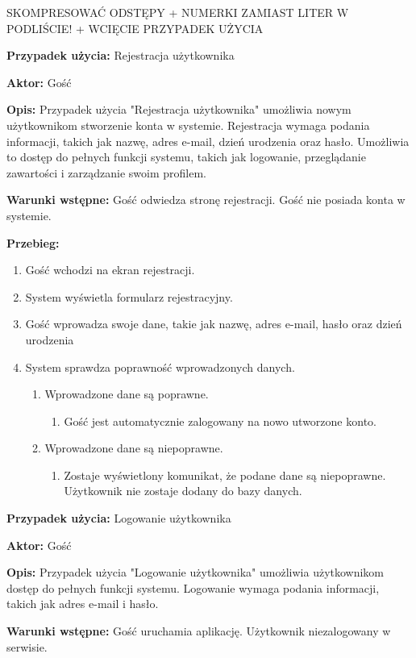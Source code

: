 SKOMPRESOWAĆ ODSTĘPY + NUMERKI ZAMIAST LITER W PODLIŚCIE! + WCIĘCIE PRZYPADEK UŻYCIA

\textbf{Przypadek użycia:} Rejestracja użytkownika

\textbf{Aktor:} Gość

\textbf{Opis:} Przypadek użycia "Rejestracja użytkownika" umożliwia nowym użytkownikom stworzenie konta w systemie. Rejestracja wymaga podania informacji, takich jak nazwę, adres e-mail, dzień urodzenia oraz hasło. Umożliwia to dostęp do pełnych funkcji systemu, takich jak logowanie, przeglądanie zawartości i zarządzanie swoim profilem.

\textbf{Warunki wstępne:} Gość odwiedza stronę rejestracji. Gość nie posiada konta w systemie.

\textbf{Przebieg:}

\begin{enumerate}
	\item Gość wchodzi na ekran rejestracji.
	\item System wyświetla formularz rejestracyjny.
	\item Gość wprowadza swoje dane, takie jak nazwę, adres e-mail, hasło oraz dzień urodzenia
	\item System sprawdza poprawność wprowadzonych danych.
	\begin{enumerate}
		\item Wprowadzone dane są poprawne.
		\begin{enumerate}
			\item Gość jest automatycznie zalogowany na nowo utworzone konto.
		\end{enumerate}
		\item Wprowadzone dane są niepoprawne.
		\begin{enumerate}
			\item Zostaje wyświetlony komunikat, że podane dane są niepoprawne. Użytkownik nie zostaje dodany do bazy danych.
		\end{enumerate}
	\end{enumerate}
\end{enumerate}


\textbf{Przypadek użycia:} Logowanie użytkownika

\textbf{Aktor:} Gość

\textbf{Opis:} Przypadek użycia "Logowanie użytkownika" umożliwia użytkownikom dostęp do
pełnych funkcji systemu. Logowanie wymaga podania informacji, takich jak adres e-mail
i hasło.

\textbf{Warunki wstępne:} Gość uruchamia aplikację. Użytkownik niezalogowany w serwisie.

